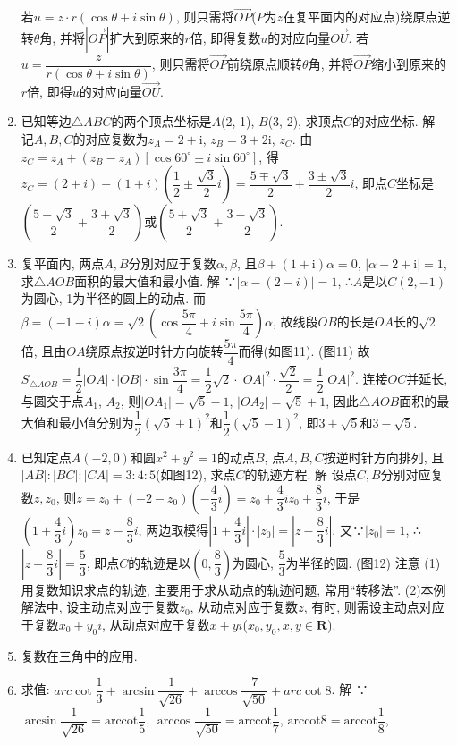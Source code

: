 \documentclass[10pt,a4paper]{article}
\begin{document}
\begin{enumerate}[1.]
若$u=z\cdot r(\cos \theta +i\sin \theta)$, 则只需将$\overrightarrow{OP}$($P$为$z$在复平面内的对应点)绕原点逆转$\theta$角, 并将$|\overrightarrow{OP}|$扩大到原来的$r$倍, 即得复数$u$的对应向量$\overrightarrow{OU}$.
若$u=\dfrac z{r(\cos \theta +i\sin \theta)}$, 则只需将$\overrightarrow{OP}$前绕原点顺转$\theta$角, 并将$\overrightarrow{OP}$缩小到原来的$r$倍, 即得$u$的对应向量$\overrightarrow{OU}$.
\item 已知等边$\triangle ABC$的两个顶点坐标是$A$(2, 1), $B$(3, 2), 求顶点$C$的对应坐标.
解  记$A,B,C$的对应复数为$z_A=2+\mathrm{i}$, $z_B=3+2\mathrm{i}$, $z_C$.
由$z_C=z_A+(z_B-z_A)[\cos 60^{\circ }\pm i\sin 60^{\circ }]$,
得$z_C=(2+i)+(1+i)(\dfrac 12\pm \dfrac{\sqrt 3}2i)=\dfrac{5\mp \sqrt 3}2+\dfrac{3\pm \sqrt 3}2i$,
即点$C$坐标是$(\dfrac{5-\sqrt 3}2+\dfrac{3+\sqrt 3}2)$或$(\dfrac{5+\sqrt 3}2+\dfrac{3-\sqrt 3}2)$.
\item 复平面内, 两点$A,B$分別对应于复数$\alpha ,\beta$, 且$\beta +(1+\mathrm{i})\alpha =0$, $|\alpha -2+\mathrm{i}|=1$, 求$\triangle AOB$面积的最大值和最小值.
解  ∵$|\alpha -(2-i)|=1$,
∴$A$是以$C(2,-1)$为圆心, 1为半径的圆上的动点.
而$\beta =(-1-i)\alpha =\sqrt 2(\cos \dfrac{5\pi }4+i\sin \dfrac{5\pi }4)\alpha$,
故线段$OB$的长是$OA$长的$\sqrt 2$倍, 且由$OA$绕原点按逆时针方向旋转$\dfrac{5\pi }4$而得(如图11).
(图11)
故$S_{\triangle AOB}=\dfrac 12|OA|\cdot|OB|\cdot \sin \dfrac{3\pi }4=\dfrac 12\sqrt 2\cdot|OA|^2\cdot \dfrac{\sqrt 2}2=\dfrac 12|OA|^2$.
连接$OC$并延长, 与圆交于点$A_1$, $A_2$, 则$|OA_1|=\sqrt 5-1$, $|OA_2|=\sqrt 5+1$, 因此$\triangle AOB$面积的最大值和最小值分别为$\dfrac 12(\sqrt 5+1)^2$和$\dfrac 12(\sqrt 5-1)^2$, 即$3+\sqrt 5$和$3-\sqrt 5$.
\item 已知定点$A(-2,0)$和圆$x^2+y^2=1$的动点$B$, 点$A,B,C$按逆时针方向排列, 且$|AB|:|BC|:|CA|=3:4:5$(如图12), 求点$C$的轨迹方程.
解  设点$C,B$分别对应复数$z,z_0$,
则$z=z_0+(-2-z_0)(-\dfrac 43i)=z_0+\dfrac 43iz_0+\dfrac 83i$,
于是$(1+\dfrac 43i)z_0=z-\dfrac 83i$, 两边取模得$|1+\dfrac 43i|\cdot|z_0|=|z-\dfrac 83i|$.
又∵$|z_0|=1$, ∴$|z-\dfrac 83i|=\dfrac 53$,
即点$C$的轨迹是以$(0,\dfrac 83)$为圆心, $\dfrac 53$为半径的圆.
(图12)
注意  (1)用复数知识求点的轨迹, 主要用于求从动点的轨迹问题, 常用``转移法''.
(2)本例解法中, 设主动点对应于复数$z_0$, 从动点对应于复数$z$, 有时, 则需设主动点对应于复数$x_0+y_0i$, 从动点对应于复数$x+yi$($x_0,y_0,x,y\in \mathbf{R}$).
\item 复数在三角中的应用.
\item 求值: $arc\cot \dfrac 13+\arcsin \dfrac 1{\sqrt {26}}+\arccos \dfrac 7{\sqrt {50}}+arc\cot 8$.
解  ∵$\arcsin \dfrac 1{\sqrt {26}}=\mathrm{arccot} \dfrac 15$, $\arccos \dfrac 1{\sqrt {50}}=\mathrm{arccot} \dfrac 17$, $\mathrm{arccot} 8=\mathrm{arccot} \dfrac 18$,

\end{enumerate}
\end{document}
